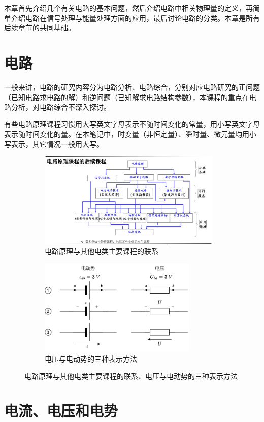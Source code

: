 \documentclass[UTF8]{report}
\theoremstyle{MyLineTheoremStyle} %
\theoremstyle{MyBlockTheoremStyle} %
\theoremstyle{MySubsubsectionStyle} %
\begin{document}
本章首先介绍几个有关电路的基本问题，然后介绍电路中相关物理量的定义，再简单介绍电路在信号处理与能量处理方面的应用，最后讨论电路的分类。本章是所有后续章节的共同基础。

\section{电路}
一般来讲，电路的研究内容分为电路分析、电路综合，分别对应电路研究的正问题（已知电路求电路的解）和逆问题（已知解求电路结构参数），本课程的重点在电路分析，对电路综合不深入探讨。

有些电路原理课程习惯用大写英文字母表示不随时间变化的常量，用小写英文字母表示随时间变化的量。在本笔记中，时变量（非恒定量）、瞬时量、微元量均用小写表示，其它情况一般用大写。

\begin{figure}[H]\centering
\begin{subfigure}[t]{0.52\textwidth}\centering
    \includegraphics[height=130pt]{assets/1,2/11b7879b24f71ddbf3e5316424203201.jpg}
    \caption{ 电路原理与其他电类主要课程的联系 }
\end{subfigure}\begin{subfigure}[t]{0.48\textwidth}\centering
    \includegraphics[height=130pt]{assets/1,2/电动势与电压.drawio.pdf}
    \caption{ 电压与电动势的三种表示方法 }
\end{subfigure}
\caption{ 电路原理与其他电类主要课程的联系、电压与电动势的三种表示方法 }\label{电路原理与其他电类主要课程的联系，电压与电动势的三种表示方法}
\end{figure}

\section{电流、电压和电势}
\end{document}
